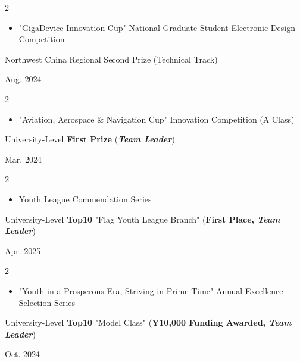 \documentclass[10pt, letterpaper]{article}
\newenvironment{highlights}{
    \begin{itemize}[
        topsep=0.10 cm,
        parsep=0.10 cm,
        partopsep=0pt,
        itemsep=0pt,
        leftmargin=0 cm + 10pt
    ]
}{
    \end{itemize}
} %
\newenvironment{twocolentry}[2][]{
    \onecolentry
    \def\secondColumn{#2}
    \setcolumnwidth{\fill, 4.5 cm}
    \begin{paracol}{2}
}{
    \switchcolumn \raggedleft \secondColumn
    \end{paracol}
    \endonecolentry
} %
\begin{document}
        \vspace{0.20 cm} 
        \begin{twocolentry}{
            Aug. 2024
        }
        \begin{highlights}
             \item "GigaDevice Innovation Cup" National Graduate Student Electronic Design Competition
        \end{highlights}
        \item \hspace{0.75 cm} Northwest China Regional Second Prize (Technical Track)
        \end{twocolentry}
        
        \vspace{0.20 cm} 
        
        \begin{twocolentry}{
            Mar. 2024
        }
        \begin{highlights}
             \item "Aviation, Aerospace \& Navigation Cup" Innovation Competition (A Class)
        \end{highlights}
        \item \hspace{0.75 cm} University-Level \textbf{First Prize} (\textbf{\textit{Team Leader}})
        \end{twocolentry}

        \vspace{0.20 cm} 
        
        \begin{twocolentry}{
            Apr. 2025
        }
        \begin{highlights}
             \item Youth League Commendation Series
        \end{highlights}
        \item \hspace{0.75 cm} University-Level \textbf{Top10} "Flag Youth League Branch" (\textbf{First Place, \textit{Team Leader}})
        \end{twocolentry}

        \vspace{0.20 cm} 
        \begin{twocolentry}{
            Oct. 2024
        }
        \begin{highlights}
             \item "Youth in a Prosperous Era, Striving in Prime Time" Annual Excellence Selection Series
        \end{highlights}
        \item \hspace{0.75 cm} University-Level \textbf{Top10} "Model Class" (\textbf{¥10,000 Funding Awarded, \textit{Team Leader}})
        \end{twocolentry}
    
\end{document}
